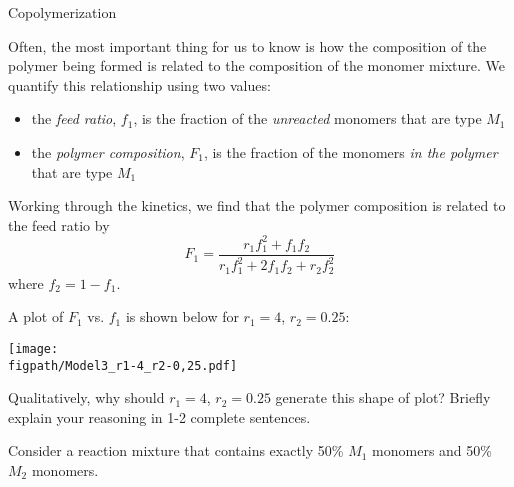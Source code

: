 \begin{activity}{Copolymerization}
\begin{ctqs}
\end{ctqs}

\vspace{0.5in}
\begin{model}
	\label{\labelbase:mdl:feedratios}
	
	Often, the most important thing for us to know is how the composition of the polymer being formed is related to the composition of the monomer mixture.  We quantify this relationship using two values:
	\begin{itemize}
		\item the \emph{feed ratio}, $f_1$, is the fraction of the \emph{unreacted} monomers that are type $M_1$
		\item the \emph{polymer composition}, $F_1$, is the fraction of  the monomers \emph{in the polymer} that are type $M_1$
	\end{itemize}
	
	Working through the kinetics, we find that the polymer composition is related to the feed ratio by
	\begin{equation*}
		F_1 = \frac{r_1f_1^2 + f_1f_2}{r_1f_1^2+2f_1f_2 + r_2f_2^2}
	\end{equation*}
	where $f_2 = 1-f_1$.

\end{model}

\clearpage
\begin{ctqs}
	\question \label{\labelbase:ctq:f1F1plot} A plot of $F_1$ vs. $f_1$ is shown below for $r_1 = 4$, $r_2=0.25$: 
	
		\vspace{3pt}
		\centerline{\texttt{[image: \\figpath/Model3\_r1-4\_r2-0,25.pdf]}}
	
		Qualitatively, why should $r_1 = 4$, $r_2=0.25$ generate this shape of plot?  Briefly explain your reasoning in 1-2 complete sentences.
				
		\begin{solution}[1.5in]\end{solution}
		
	\question Consider a reaction mixture that contains exactly 50\% $M_1$ monomers and 50\% $M_2$ monomers.
	

\end{ctqs}
\end{activity}
